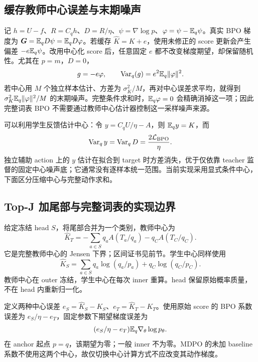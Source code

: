 \subsection{缓存教师中心误差与末期噪声}

记 $h=U-f$、$R=C_qh$、$D=R/\eta$、$\psi=\nabla\log p$、$\varphi=\psi-\mathbb E_q\psi$。真实 BPO 梯度为 $\bm G=\mathbb E_qD\psi=\mathbb E_qD\varphi$。若缓存 $\widehat K=K+e$，使用未修正的 score 更新会产生偏差 $-e\mathbb E_q\psi$。改用中心化 score 后，任意固定 $e$ 都不改变梯度期望，却保留随机性。尤其在 $p=m$，$D=0$，
\begin{equation}
 g=-e\varphi,\qquad
 \operatorname{Var}_q(g)=e^2\mathbb E_q\|\varphi\|^2.
\end{equation}
若中心用 $M$ 个独立样本估计、方差为 $\sigma_K^2/M$，再对中心误差求平均，就得到 $\sigma_K^2\mathbb E_q\|\varphi\|^2/M$ 的末期噪声。完整条件求和时，$\mathbb E_q\varphi=0$ 会精确消掉这一项；因此完整词表 BPO 不需要通过教师中心估计器控制这一采样噪声来源。

可以利用学生反馈估计中心：令 $y=C_qU/\eta-A$，则 $\mathbb E_qy=K$，而
\begin{equation}
 \operatorname{Var}_qy=\operatorname{Var}_qD=\frac{2\mathcal L_{\mathrm{BPO}}}{\eta}.
\end{equation}
独立辅助 action 上的 $y$ 估计在拟合到 target 时方差消失，优于仅依靠 teacher 监督的固定中心噪声底；它通常没有逐样本统一范围。当前实现采用显式条件中心，下面区分压缩中心与完整动作求和。

\subsection{Top-J 加尾部与完整词表的实现边界}

给定冻结 head $S$，将尾部合并为一个类别，教师中心为
\begin{equation}
 \widehat K_T=-\sum_{a\in S}q_aA(T_a/q_a)
             -q_C A(T_C/q_C).
\end{equation}
它是完整教师中心的 Jensen 下界；区间证书见前节。学生中心同样使用
\begin{equation}
 \widehat K_S=\sum_{a\in S}q_a\log(q_a/p_a)
              +q_C\log(q_C/p_C).
\end{equation}
教师中心在 outer 冻结，学生中心在每次 inner 重算。head 保留原始概率质量，不在 head 内重新归一化。

定义两种中心误差 $e_S=\widehat K_S-K_S$、$e_T=\widehat K_T-K_T$。使用原始 score 的 BPO 系数误差为 $e_S/\eta-e_T$，固定参数下期望梯度误差为
\begin{equation}
 (e_S/\eta-e_T)\mathbb E_q\nabla_\theta\log p_\theta.
\end{equation}
在 anchor 起点 $p=q$，该期望为零；一般 inner 不为零。MDPO 的未加 baseline 系数不使用这两个中心，故仅切换中心计算方式不应改变其动作梯度。


